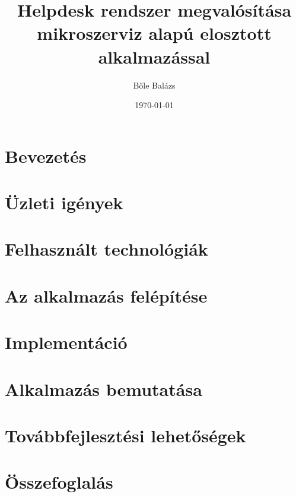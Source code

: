 


\title{\foreignlanguage{british}{Helpdesk} rendszer megvalósítása mikroszerviz alapú elosztott alkalmazással}
\author{Bőle Balázs}
\date{\today}
\graphicspath{{Figs/}}  %


\sloppy
{}
\makeatletter  %

\makeatother

\clearpage


\pagestyle{front}
\tableofcontents

\begingroup
\let\clearpage\relax
\listoffigures
\endgroup


\clearpage
{}
\chapter*{Bevezetés}\label{ch:bevezetes}



\chapter{Üzleti igények}\label{ch:uzleti_igenyek}
\pagestyle{main}



\chapter[Technológiai áttekintés]{Felhasznált technológiák}\label{ch:felhasznalt_technologiak}
\pagestyle{main}



\chapter{Az alkalmazás felépítése}
\pagestyle{main}



\chapter{Implementáció}
\pagestyle{main}



\chapter{Alkalmazás bemutatása}
\pagestyle{main}



\chapter{Továbbfejlesztési lehetőségek}
\pagestyle{main}



\chapter*{Összefoglalás}\label{ch:osszefoglalas}
\pagestyle{plain}


\newpage









